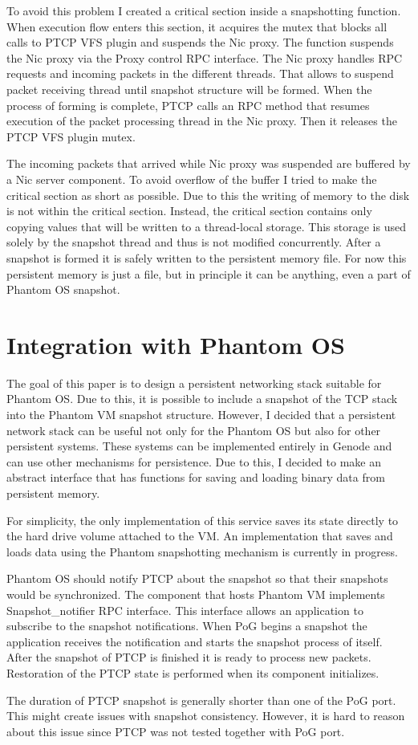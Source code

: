 To avoid this problem I created a critical section inside a snapshotting
function. When execution flow enters this section, it acquires the mutex that
blocks all calls to PTCP VFS plugin and suspends the Nic proxy. The function
suspends the Nic proxy via the Proxy control RPC interface. The Nic proxy 
handles RPC requests and incoming packets in the different threads. That allows
to suspend packet receiving thread until snapshot structure will be formed.
When the process of forming is complete, PTCP calls an RPC method that resumes
execution of the packet processing thread in the Nic proxy. Then it releases
the PTCP VFS plugin mutex. 

The incoming packets that arrived while Nic proxy was suspended are buffered by
a Nic server component. To avoid overflow of the buffer I tried to make the
critical section as short as possible. Due to this the writing of memory to the
disk is not within the critical section. Instead, the critical section contains
only copying values that will be written to a thread-local storage. This
storage is used solely by the snapshot thread and thus is not modified
concurrently. After a snapshot is formed it is safely written to the persistent
memory file. For now this persistent memory is just a file, but in principle it
can be anything, even a part of Phantom OS snapshot.

\section{Integration with Phantom OS}

The goal of this paper is to design a persistent networking stack suitable for
Phantom OS. Due to this, it is possible to include a snapshot of the TCP stack
into the Phantom VM snapshot structure. However, I decided that a persistent
network stack can be useful not only for the Phantom OS but also for other
persistent systems. These systems can be implemented entirely in Genode and can
use other mechanisms for persistence. Due to this, I decided to make an abstract
interface that has functions for saving and loading binary data from persistent
memory.

For simplicity, the only implementation of this service saves its state
directly to the hard drive volume attached to the VM. An implementation that
saves and loads data using the Phantom snapshotting mechanism is currently in
progress.

Phantom OS should notify PTCP about the snapshot so that their snapshots would
be synchronized. The component that hosts Phantom VM implements
Snapshot\_notifier RPC interface. This interface allows an application to
subscribe to the snapshot notifications. When PoG begins a snapshot the
application receives the notification and starts the snapshot process of itself.
After the snapshot of PTCP is finished it is ready to process new packets.
Restoration of the PTCP state is performed when its component initializes.

The duration of PTCP snapshot is generally shorter than one of the PoG port.
This might create issues with snapshot consistency. However, it is hard to
reason about this issue since PTCP was not tested together with PoG port.
